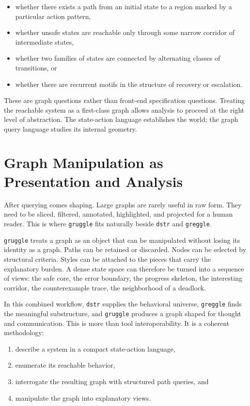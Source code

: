 \documentclass[11pt]{article}
\begin{document}
\begin{itemize}[leftmargin=*]
\item whether there exists a path from an initial state to a region marked by a
particular action pattern,
\item whether unsafe states are reachable only through some narrow corridor of
intermediate states,
\item whether two families of states are connected by alternating classes of
transitions, or
\item whether there are recurrent motifs in the structure of recovery or
escalation.
\end{itemize}

These are graph questions rather than front-end specification questions.
Treating the reachable system as a first-class graph allows analysis to proceed
at the right level of abstraction. The state-action language establishes the
world; the graph query language studies its internal geometry.

\section{Graph Manipulation as Presentation and Analysis}

After querying comes shaping. Large graphs are rarely useful in raw form. They
need to be sliced, filtered, annotated, highlighted, and projected for a human
reader. This is where \texttt{gruggle} fits naturally beside \texttt{dstr} and
\texttt{greggle}.

\texttt{gruggle} treats a graph as an object that can be manipulated without
losing its identity as a graph. Paths can be retained or discarded. Nodes can be
selected by structural criteria. Styles can be attached to the pieces that carry
the explanatory burden. A dense state space can therefore be turned into a
sequence of views: the safe core, the error boundary, the progress skeleton, the
interesting corridor, the counterexample trace, the neighborhood of a deadlock.

In this combined workflow, \texttt{dstr} supplies the behavioral universe,
\texttt{greggle} finds the meaningful substructure, and \texttt{gruggle}
produces a graph shaped for thought and communication. This is more than tool
interoperability. It is a coherent methodology:

\begin{enumerate}[leftmargin=*]
\item describe a system in a compact state-action language,
\item enumerate its reachable behavior,
\item interrogate the resulting graph with structured path queries, and
\item manipulate the graph into explanatory views.
\end{enumerate}
\end{document}

